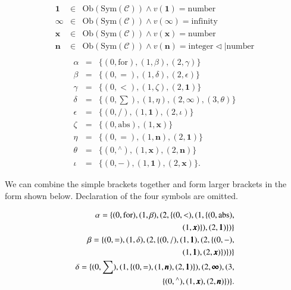 \documentclass{aims}
\numberwithin{equation}{section}
\numberwithin{theorem}{section}	%
\numberwithin{axiom}{section}	%
\numberwithin{definition}{section}	%
\begin{document}
	\begin{equation*}
		\begin{aligned}
			\pmb{1} &\in& \text{Ob}(\text{Sym}(\mathcal{C}))\land \mathit{v}(\pmb{1})=\text{number}\\
			\pmb{\infty } &\in& \text{Ob}(\text{Sym}(\mathcal{C}))\land \mathit{v}(\pmb{\infty })=\text{infinity}\\
			\pmb{x} &\in& \text{Ob}(\text{Sym}(\mathcal{C}))\land \mathit{v}(\pmb{x})=\text{number}\\
			\pmb{n} &\in& \text{Ob}(\text{Sym}(\mathcal{C}))\land \mathit{v}(\pmb{n})=\text{integer}\triangleleft |\text{number}\\
		\end{aligned}
	\end{equation*}
	\begin{equation*}
		\begin{aligned}
			\alpha &=& \{(0,\text{for}),(1,\beta ),(2,\gamma )\}\\
			\beta &=& \{(0,=),(1,\delta ),(2,\epsilon )\}\\
			\gamma &=& \{(0,<),(1,\zeta ),(2,\pmb{1})\}\\
			\delta &=& \{(0,\sum ),(1,\eta ),(2,\pmb{\infty }), (3,\theta )\}\\
			\epsilon &=& \{(0,/),(1,\pmb{1}),(2,\iota )\}\\
			\zeta &=& \{(0,\text{abs}),(1,\pmb{x})\}\\
			\eta &=& \{(0,=),(1,\pmb{n}),(2,\pmb{1})\}\\
			\theta &=& \{(0,{}^{\wedge}),(1,\pmb{x}),(2,\pmb{n})\}\\
			\iota &=& \{(0,-),(1,\pmb{1}),(2,\pmb{x})\}.
		\end{aligned}
	\end{equation*}
	
	We can combine the simple brackets together and form larger brackets in the form shown below. Declaration of the four symbols are omitted.
	
	\begin{equation}
		\begin{split}
			\alpha = \{(0,\text{for}),(1,\beta ),(2,\{(0,<),(1,\{(0,\text{abs}),\\(1,\pmb{x})\}),(2,\pmb{1})\})\}\hfill\\
			\beta = \{(0,=),(1,\delta ),(2,\{(0,/),(1,\pmb{1}),(2,\{(0,-),\\(1,\pmb{1}),(2,\pmb{x})\})\})\}\hfill\\
			\delta = \{(0,\sum ),(1,\{(0,=),(1,\pmb{n}),(2,\pmb{1})\}),(2,\pmb{\infty }), (3,\\\{(0,{}^{\wedge}),(1,\pmb{x}),(2,\pmb{n})\})\}.\hfill\\
		\end{split}
	\end{equation}
	
\end{document}
